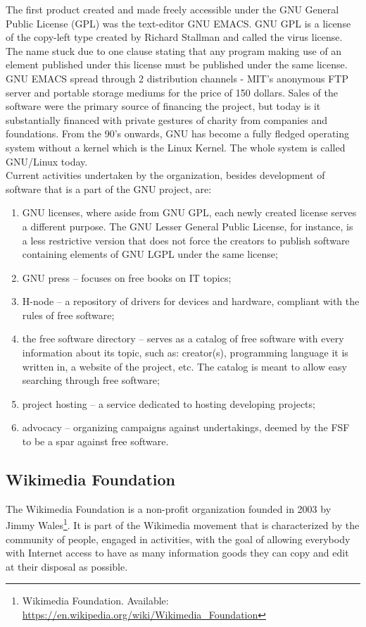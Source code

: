 \documentclass[a4paper]{article}
\begin{document}
\noindent
The first product created and made freely accessible under the GNU General Public License (GPL) was the text-editor GNU EMACS. GNU GPL is a license of the copy-left type created by Richard Stallman and called the virus license. The name stuck due to one clause stating that any program making use of an element published under this license must be published under the same license. GNU EMACS spread through 2 distribution channels - MIT's anonymous FTP server and portable storage mediums for the price of 150 dollars. Sales of the software were the primary source of financing the project, but today is it substantially financed with private gestures of charity from companies and foundations. From the 90's onwards, GNU has become a fully fledged operating system without a kernel which is the Linux Kernel. The whole system is called GNU/Linux today. \\

\noindent
Current activities undertaken by the organization, besides development of software that is a part of the GNU project, are:

\begin{enumerate}
\item GNU licenses, where aside from GNU GPL, each newly created license serves a different purpose. The GNU Lesser General Public License, for instance, is a less restrictive version that does not force the creators to publish software containing elements of GNU LGPL under the same license;
\item GNU press -- focuses on free books on IT topics;
\item H-node -- a repository of drivers for devices and hardware, compliant with the rules of free software;
\item the free software directory -- serves as a catalog of free software with every information about its topic, such as: creator(s), programming language it is written in, a website of the project, etc. The catalog is meant to allow easy searching through free software;
\item project hosting -- a service dedicated to hosting developing projects;
\item advocacy -- organizing campaigns against undertakings, deemed by the FSF to be a spar against free software.
\end{enumerate}

\subsection{Wikimedia Foundation} \label{wiki}
The Wikimedia Foundation is a non-profit organization founded in 2003 by Jimmy Wales\footnote{Wikimedia Foundation. Available: \url{https://en.wikipedia.org/wiki/Wikimedia_Foundation}}. It is part of the Wikimedia movement that is characterized by the community of people, engaged in activities, with the goal of allowing everybody with Internet access to have as many information goods they can copy and edit at their disposal as possible.\\ 
\end{document}
